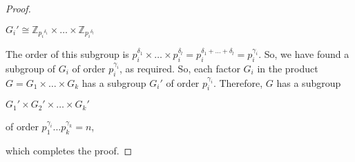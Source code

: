 \documentclass[executivepaper]{article}
\begin{document}
\begin{flushleft}
\begin{proof}
\begin{center}

$G_i' \cong \mathbb{Z}_{{p_i}^{\delta_1}} \times \ldots \times \mathbb{Z}_{{p_i}^{\delta_l}}$

\end{center}

The order of this subgroup is $p_i^{\delta_1} \times \ldots \times p_i^{\delta_l} = p_i^{\delta_1 + \ldots + \delta_l} = p_i^{\gamma_i} $. So, we have found a subgroup of $G_i$ of order $p_i^{\gamma_i}$, as required. So, each factor $G_i$ in the product $G = G_1 \times \ldots \times G_k$ has a subgroup $G_i'$ of order $p_i^{\gamma_i}$. Therefore, $G$ has a subgroup

\begin{center}

$G_1' \times G_2' \times \ldots \times G_k'$

of order $p_1^{\gamma_i}...p_k^{\gamma_k} = n$,

\end{center}

which completes the proof.

\end{proof}

\end{flushleft}
\end{document}
